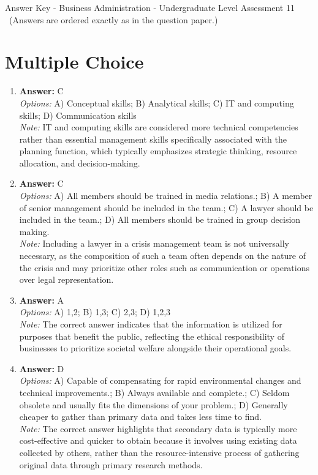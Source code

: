\documentclass[12pt]{article}
\begin{document}
\begin{center}
Answer Key - Business Administration - Undergraduate Level Assessment 11 \
\small (Answers are ordered exactly as in the question paper.)
\end{center}

\section*{Multiple Choice}
\begin{enumerate}[label=\arabic*.]
\item \textbf{Answer:} C
\\ \textit{Options:} A) Conceptual skills; B) Analytical skills; C) IT and computing skills; D) Communication skills
\\ \textit{Note:} IT and computing skills are considered more technical competencies rather than essential management skills specifically associated with the planning function, which typically emphasizes strategic thinking, resource allocation, and decision-making.
\item \textbf{Answer:} C
\\ \textit{Options:} A) All members should be trained in media relations.; B) A member of senior management should be included in the team.; C) A lawyer should be included in the team.; D) All members should be trained in group decision making.
\\ \textit{Note:} Including a lawyer in a crisis management team is not universally necessary, as the composition of such a team often depends on the nature of the crisis and may prioritize other roles such as communication or operations over legal representation.
\item \textbf{Answer:} A
\\ \textit{Options:} A) 1,2; B) 1,3; C) 2,3; D) 1,2,3
\\ \textit{Note:} The correct answer indicates that the information is utilized for purposes that benefit the public, reflecting the ethical responsibility of businesses to prioritize societal welfare alongside their operational goals.
\item \textbf{Answer:} D
\\ \textit{Options:} A) Capable of compensating for rapid environmental changes and technical improvements.; B) Always available and complete.; C) Seldom obsolete and usually fits the dimensions of your problem.; D) Generally cheaper to gather than primary data and takes less time to find.
\\ \textit{Note:} The correct answer highlights that secondary data is typically more cost-effective and quicker to obtain because it involves using existing data collected by others, rather than the resource-intensive process of gathering original data through primary research methods.

\end{enumerate}
\end{document}

